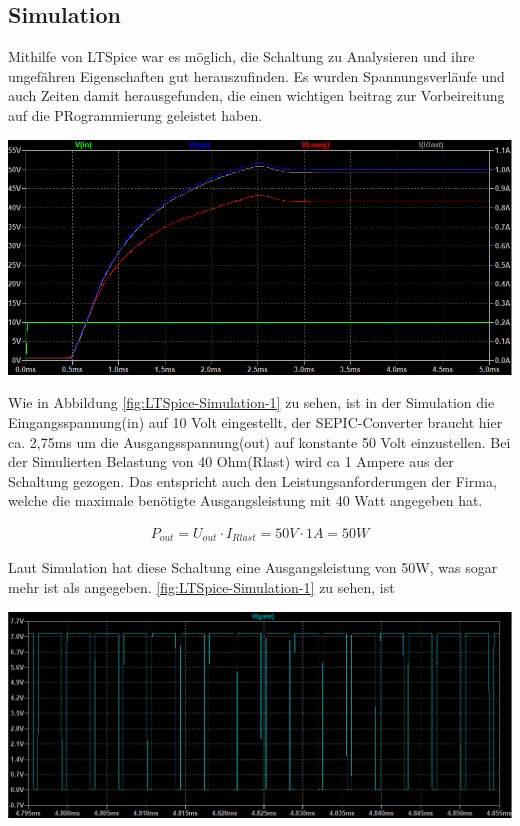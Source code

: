 \documentclass[paper=a4, 12pt]{scrreprt}
\begin{document}
		\subsection{Simulation}
			Mithilfe von LTSpice war es möglich, die Schaltung zu Analysieren und ihre ungefähren Eigenschaften gut herauszufinden. Es wurden Spannungsverläufe und auch Zeiten damit herausgefunden, die einen wichtigen beitrag zur Vorbeireitung auf die PRogrammierung geleistet haben.
			\begin{adjustbox}{center,caption={Simulation der Schaltung Mittels LTSpice},label={fig:LTSpice-Simulation-1},nofloat=figure,vspace=\bigskipamount}
				\includegraphics[width=\textwidth]{img/LTSpice_Simulation_1.PNG}
			\end{adjustbox}
			Wie in Abbildung \ref{fig:LTSpice-Simulation-1} zu sehen, ist in der Simulation die Eingangsspannung(in) auf 10 Volt eingestellt, der SEPIC-Converter braucht hier ca. 2,75ms um die Ausgangsspannung(out) auf konstante 50 Volt einzustellen. Bei der Simulierten Belastung von 40 Ohm(Rlast) wird ca 1 Ampere aus der Schaltung gezogen. Das entspricht auch den Leistungsanforderungen der Firma, welche die maximale benötigte Ausgangsleistung mit 40 Watt angegeben hat. 
			
			\begin{align*} 
			P_{out} = U_{out} \cdot I_{Rlast} = 50V \cdot 1A = 50W
			\end{align*} 
			
			Laut Simulation hat diese Schaltung eine Ausgangsleistung von 50W, was sogar mehr ist als angegeben. 
			\ref{fig:LTSpice-Simulation-1} zu sehen, ist
			\begin{adjustbox}{center,caption={Simulation der Schaltung Mittels LTSpice},label={fig:LTSpice-Simulation-2},nofloat=figure,vspace=\bigskipamount}
				\includegraphics[width=\textwidth]{img/LTSpice_Simulation_2.PNG}
			\end{adjustbox}
			
\end{document}
